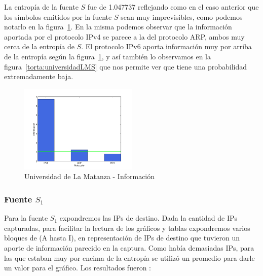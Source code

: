 \documentclass[final,inline,narroweqnarray,a4paper]{ieee}
\begin{document}
La entropía de la fuente $S$ fue de 1.047737 reflejando como en el caso anterior que los símbolos emitidos por la fuente $S$ sean muy imprevisibles, como podemos notarlo en la figura~\ref{histo:universidadLMS}. En la misma podemos observar que la información aportada por el protocolo IPv4 se parece a la del protocolo ARP, ambos muy cerca de la entropía de $S$. El protocolo IPv6 aporta información muy por arriba de la entropía según la figura~\ref{histo:universidadLMS}, y así también lo observamos en la figura~\ref{torta:universidadLMS} que nos permite ver que tiene una probabilidad extremadamente baja.

\begin{figure}[H]
    \begin{center}
        \includegraphics[width=0.5\textwidth]{plot/facultadS-bar.png}
        \caption{Universidad de La Matanza - Información}
        \label{histo:universidadLMS}
    \end{center}
\end{figure}

\subsubsection{Fuente $S_1$}

Para la fuente $S_1$ expondremos las IPs de destino. Dada la cantidad de IPs capturadas, para facilitar la lectura de los gráficos y tablas expondremos varios bloques de (A hasta I), en representación de IPs de destino que tuvieron un aporte de información parecido en la captura. Como había demasiadas IPs, para las que estaban muy por encima de la entropía se utilizó un promedio para darle un valor para el gráfico. Los resultados fueron :
\end{document}
